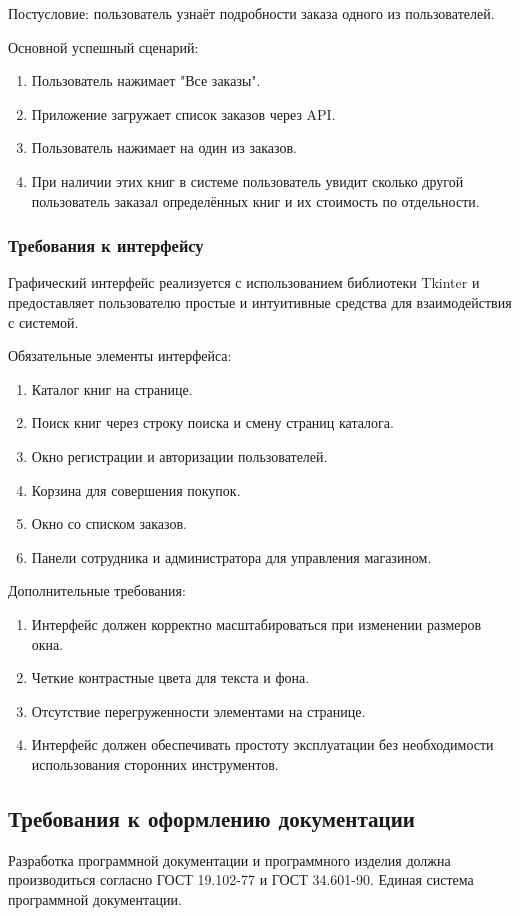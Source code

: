 Постусловие: пользователь узнаёт подробности заказа одного из пользователей.

Основной успешный сценарий:

\begin{enumerate}
	\item Пользователь нажимает "Все заказы".
	\item Приложение загружает список заказов через API.
	\item Пользователь нажимает на один из заказов.
	\item При наличии этих книг в системе пользователь увидит сколько другой пользователь заказал определённых книг и их стоимость по отдельности.
\end{enumerate}


\subsubsection{Требования к интерфейсу}

Графический интерфейс реализуется с использованием библиотеки Tkinter и предоставляет пользователю простые и интуитивные средства для взаимодействия с системой.

Обязательные элементы интерфейса:
\begin{enumerate}
	\item Каталог книг на странице.
	\item Поиск книг через строку поиска и смену страниц каталога.		
	\item Окно регистрации и авторизации пользователей.	
	\item Корзина для совершения покупок.	
	\item Окно со списком заказов.
	\item Панели сотрудника и администратора для управления магазином.
\end{enumerate}
Дополнительные требования:
\begin{enumerate}
	\item Интерфейс должен корректно масштабироваться при изменении размеров окна.	
	\item Четкие контрастные цвета для текста и фона.
	\item Отсутствие перегруженности элементами на странице.
	\item Интерфейс должен обеспечивать простоту эксплуатации без необходимости использования сторонних инструментов.
\end{enumerate}


\subsection{Требования к оформлению документации}

Разработка программной документации и программного изделия должна производиться согласно ГОСТ 19.102-77 и ГОСТ 34.601-90. Единая система программной документации.
